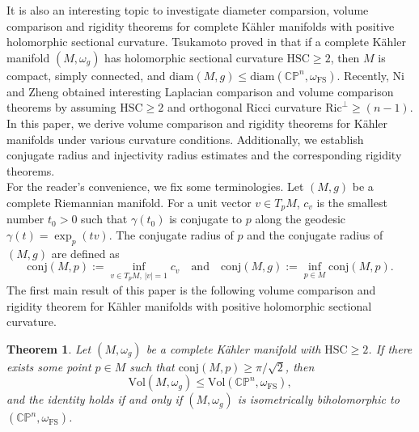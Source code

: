 \documentclass[12pt]{amsart}
\theoremstyle{plain}
\newtheorem{thm}{Theorem}[section]
\theoremstyle{definition}
\newcommand{\btheorem}{\begin{thm}}
\newcommand{\etheorem}{\end{thm}}
\newcommand{\beq}{\begin{equation}}
\newcommand{\eeq}{\end{equation}}
\newcommand{\qtq}[1]{\quad\mbox{#1}\quad}
\renewcommand{\>}{\rightarrow}
\newcommand{\C}{{\mathbb C}}
\renewcommand{\P}{{\mathbb P}}
\newcommand{\om}{\omega}
\numberwithin{equation}{section} %
\begin{document}
		
		
		
	It is also an interesting topic to investigate diameter comparsion, volume comparison and rigidity theorems  for complete K\"ahler manifolds with positive holomorphic sectional curvature.
	Tsukamoto  proved in \cite{Tsu57} that if a complete K\"ahler manifold $(M,\omega_g)$ has holomorphic sectional curvature $\mathrm{HSC}\ge 2$, 
		then $M$ is compact, simply connected, and $\mathrm{diam}(M,g)\le \mathrm{diam}(\C\P^n,\om_{\mathrm{FS}})$.
	Recently, Ni and Zheng \cite{NZ18} obtained interesting Laplacian comparison and volume comparison theorems by assuming $\mathrm{HSC}\ge 2$ and orthogonal Ricci curvature $\mathrm{Ric}^\perp\ge (n-1)$. \\		
		
	In this paper, we derive volume comparison and rigidity theorems for Kähler manifolds under various curvature conditions. 
	Additionally, we establish  conjugate radius and injectivity radius estimates and the corresponding rigidity theorems.\\
			
  For the reader's convenience, we fix some terminologies.	Let $(M,g)$ be a complete Riemannian manifold. For a unit vector $v \in T_pM$, 
	$c_v$ is the smallest number $t_0>0$ such that $\gamma(t_0)$ is conjugate to $p$ along the geodesic $\gamma(t)=\exp_p(tv)$.  
	The {conjugate radius of $p$} and the {conjugate radius of $(M,g)$} are defined as 
	\[ 
	\mathrm{conj}(M,p):=\inf_{v\in T_pM,\,|v|=1}c_v\qtq{and}\mathrm{conj}(M,g):=\inf_{p\in M}\mathrm{conj}(M,p).
	\] 
	The first main result of this paper is the following volume comparison and rigidity theorem for K\"ahler manifolds with positive holomorphic sectional curvature.
	\btheorem  \label{main4} 
	Let $(M,\omega_g)$ be a complete K\"ahler manifold with $\mathrm{HSC}\ge 2$. If there exists some point $p\in M$ such that  $\mathrm{conj}(M,p)\geq \pi/\sqrt{2}$, then 
	\beq 
	\mathrm{Vol}\left(M,\omega_g\right)\le \mathrm{Vol}\left(\C\P^n, \omega_{\mathrm{FS}}\right), \label{vol comparison}
	\eeq  
	and the identity holds if and only if $(M,\omega_g)$ is isometrically biholomorphic to $(\C\P^n,\omega_{\mathrm{FS}})$.
	\etheorem 
	
\end{document}
